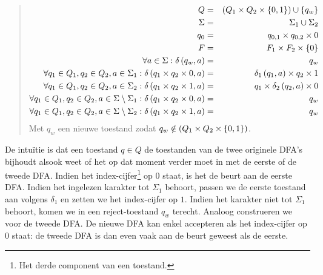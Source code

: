 \documentclass{article}
\begin{document}
\begin{question}
\begin{answer}
\begin{enumerate}
\begin{quote}
\begin{construction}
 \begin{eqnarray}
  Q&=&\left( Q_1\times Q_2\times\left\{ 0,1 \right\} \right)\cup\left\{ q_w \right\}\\
  \Sigma&=&\Sigma_1\cup\Sigma_2\\
  q_0&=&q_{0,1}\times q_{0,2}\times 0\\
  F&=&F_1\times F_2\times\left\{ 0 \right\}\\
  \forall a\in \Sigma:\delta\left( q_w,a \right)&=&q_w\\
  \forall q_1\in Q_1,q_2\in Q_2,a\in \Sigma_1:\delta\left( q_1\times q_2\times 0,a \right)&=&\delta_1\left( q_1,a \right)\times q_2\times 1\\
  \forall q_1\in Q_1,q_2\in Q_2,a\in \Sigma_2:\delta\left( q_1\times q_2\times 1,a \right)&=&q_1\times\delta_2\left( q_2,a \right)\times 0\\
  \forall q_1\in Q_1,q_2\in Q_2,a\in \Sigma\setminus\Sigma_1:\delta\left( q_1\times q_2\times 0,a \right)&=&q_w\\
  \forall q_1\in Q_1,q_2\in Q_2,a\in \Sigma\setminus\Sigma_2:\delta\left( q_1\times q_2\times 1,a \right)&=&q_w
 \end{eqnarray}
 Met $q_w$ een nieuwe toestand zodat $q_w\notin\left( Q_1\times Q_2\times\left\{ 0,1 \right\} \right)$.
 \end{construction}
 \end{quote}
 De intu\"itie is dat een toestand $q\in Q$ de toestanden van de twee originele DFA's bijhoudt alsook weet of het op dat moment verder moet in met de eerste of de tweede DFA. Indien het index-cijfer\footnote{Het derde component van een toestand.} op $0$ staat, is het de beurt aan de eerste DFA. Indien het ingelezen karakter tot $\Sigma_1$ behoort, passen we de eerste toestand aan volgens $\delta_1$ en zetten we het index-cijfer op $1$. Indien het karakter niet tot $\Sigma_1$ behoort, komen we in een reject-toestand $q_w$ terecht. Analoog construeren we voor de tweede DFA. De nieuwe DFA kan enkel accepteren als het index-cijfer op $0$ staat: de tweede DFA is dan even vaak aan de beurt geweest als de eerste.
\end{enumerate}
\end{answer}
\end{question}
\end{document}
